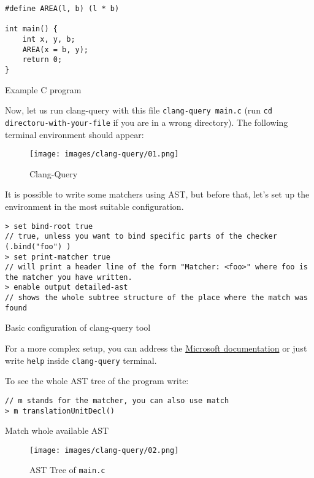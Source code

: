 \begin{listing}[h]
\begin{verbatim}
#define AREA(l, b) (l * b)

int main() {
    int x, y, b;
    AREA(x = b, y);
    return 0;
}
\end{verbatim}
\caption{Example C program}
\label{code:c-example}
\end{listing}


Now, let us run clang-query with this file \lstinline{clang-query main.c} (run \lstinline{cd directoru-with-your-file} if you are in a wrong directory). The following terminal environment should appear:

\begin{figure}[H]
	\centering
        \caption{ Clang-Query }
	\texttt{[image: images/clang-query/01.png]}
	\label{fig:clang-query-run}
\end{figure}

It is possible to write some matchers using AST, but before that, let's set up the environment in the most suitable configuration. 

\begin{listing}[h]
\begin{verbatim}
> set bind-root true
// true, unless you want to bind specific parts of the checker (.bind("foo") )
> set print-matcher true
// will print a header line of the form "Matcher: <foo>" where foo is the matcher you have written.
> enable output detailed-ast
// shows the whole subtree structure of the place where the match was found
\end{verbatim}
\caption{Basic configuration of clang-query tool}
\label{code:query-config}
\end{listing}

For a more complex setup, you can address the \href{https://devblogs.microsoft.com/cppblog/exploring-clang-tooling-part-2-examining-the-clang-ast-with-clang-query/}{Microsoft documentation} or just write \lstinline{help} inside \lstinline{clang-query} terminal.

To see the whole AST tree of the program write:

\begin{listing}[h]
\begin{verbatim}
// m stands for the matcher, you can also use match 
> m translationUnitDecl()
\end{verbatim}
\caption{Match whole available AST}
\label{code:query-tr-unit-decl}
\end{listing}


\begin{figure}[H]
	\centering
        \caption{ AST Tree of \lstinline{main.c} }
	\texttt{[image: images/clang-query/02.png]}
	\label{fig:clang-query-tr-ast}
\end{figure}
